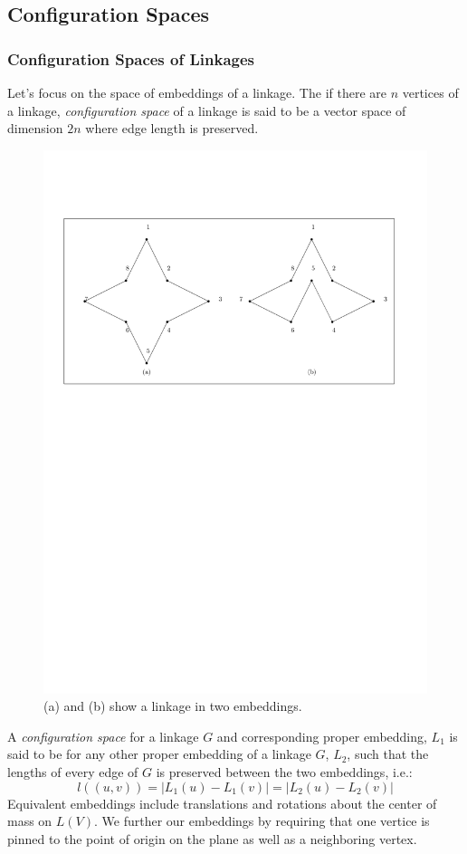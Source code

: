 \subsection{Configuration Spaces}
\subsubsection{Configuration Spaces of Linkages}
Let's focus on the space of embeddings of a linkage. The if there are $n$ vertices of a linkage, 
\textit{configuration space} of a linkage is said to be a vector space of dimension $2 n$ 
where edge length is preserved.  
\begin{figure}[!h]
\begin{center}
\includegraphics[scale=.75]{graphics/twoEmbeddingsOfSameLinkage.pdf}
\end{center} 
\caption{(a) and (b) show a linkage in two embeddings.}
\label{fig:configuration-3}
\end{figure}
A \textit{configuration space} for a linkage $G$ and corresponding proper embedding, $L_1$ is said 
to be for any other proper embedding of a linkage $G$, $L_2$, such that the lengths 
of every edge of $G$ is preserved between the two embeddings, i.e.: 
$$l\left( \left(u,v\right) 
\right) = \left\vert 
L_1(u) - L_1(v) \right\vert = \left\vert L_2(u) - L_2(v) \right\vert$$
Equivalent embeddings include translations and rotations about the center of mass on $L(V)$.  We 
further our embeddings by requiring that one vertice is pinned to the point of origin on the plane 
as well as a neighboring vertex.
